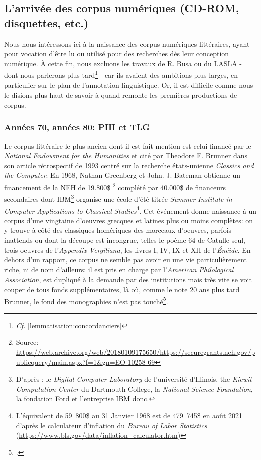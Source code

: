\subsection{L’arrivée des corpus numériques (CD-ROM, disquettes, etc.)}


Nous nous intéressons ici à la naissance des corpus numériques littéraires, ayant pour vocation d'être lu ou utilisé pour des recherches dès leur conception numérique. À cette fin, nous excluons les travaux de R. Busa ou du LASLA - dont nous parlerons plus tard\footnote{\textit{Cf.} \ref{lemmatisation:concordanciers}} - car ils avaient des ambitions plus larges, en particulier sur le plan de l'annotation linguistique. Or, il est difficile comme nous le disions plus haut de savoir à quand remonte les premières productions de corpus.


\subsubsection{Années 70, années 80: PHI et TLG}

Le corpus littéraire le plus ancien dont il est fait mention est celui financé par le \textit{National Endowment for the Humanities} et cité par Theodore F. Brunner dans son article rétrospectif de 1993 centré sur la recherche états-unienne \textit{Classics and the Computer}. En 1968, Nathan Greenberg et John. J. Bateman obtienne un financement de la NEH de 19.800\$ \footnote{Source: \url{https://web.archive.org/web/20180109175650/https://securegrants.neh.gov/publicquery/main.aspx?f=1&gn=EO-10258-69}} complété par 40.000\$ de financeurs secondaires dont IBM\footnote{D'après \cite{brunner}: le \textit{Digital Computer Laboratory} de l'université d'Illinois, the \textit{Kiewit Computation Center} du Dartmouth College, la \textit{National Science Foundation}, la fondation Ford et l'entreprise IBM donc.} organise une école d'été titrée \textit{Summer Institute in Computer Applications to Classical Studies}\footnote{L'équivalent de 59~800\$ au 31 Janvier 1968 est de 479~745\$ en août 2021 d'après le calculateur d'inflation du \textit{Bureau of Labor Statistics} (\url{https://www.bls.gov/data/inflation_calculator.htm})}. Cet événement donne naissance à un corpus d'une vingtaine d'oeuvres grecques et latines plus ou moins complètes: on y trouve à côté des classiques homériques des morceaux d'oeuvres, parfois inattends ou dont la découpe est incongrue, telles le poème 64 de Catulle seul, trois oeuvres de l'\textit{Appendix Vergiliana}, les livres I, IV, IX et XII de l'\textit{Énéide}. En dehors d'un rapport, ce corpus ne semble pas avoir eu une vie particulièrement riche, ni de nom d'ailleurs: il est pris en charge par l'\textit{American Philological Association}, est dupliqué à la demande par des institutions mais très vite se voit couper de tous fonds supplémentaires, là où, comme le note 20 ans plus tard Brunner, le fond des monographies n'est pas touché\footcite{brunner}.

